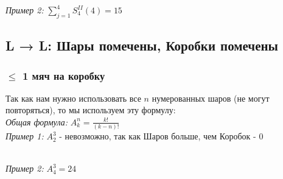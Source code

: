 \documentclass{article}
\begin{document}
                \textit{Пример 2:} $ \sum\limits_{j=1}^{4} S^{II}_{4}(4) = 15 $
                \begin{figure}[h!]
                \end{figure}
        \subsection{L → L: Шары помечены, Коробки помечены}
            \subsubsection{$\le$ 1 мяч на коробку}
                Так как нам нужно использовать все $n$ нумерованных шаров (не могут повторяться), то мы используем эту формулу:\\
                \textit{Общая формула:} $ A^n_k = \frac{k!}{(k-n)!} $\\
                \textit{Пример 1:} $ A^3_2 $ - невозможно, так как Шаров больше, чем Коробок - 0
                \begin{figure}[h!]
                \end{figure}\\
                \textit{Пример 2:} $ A^3_4 = 24 $
                \begin{figure}[h!]
                \end{figure}
                \newpage
\end{document}
